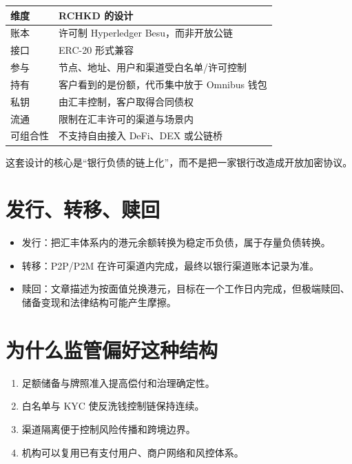 {\def\LTcaptype{none} %
\begin{longtable}[]{@{}ll@{}}
\toprule\noalign{}
维度 & RCHKD 的设计 \\
\midrule\noalign{}
\endhead
\bottomrule\noalign{}
\endlastfoot
账本 & 许可制 Hyperledger Besu，而非开放公链 \\
接口 & ERC-20 形式兼容 \\
参与 & 节点、地址、用户和渠道受白名单/许可控制 \\
持有 & 客户看到的是份额，代币集中放于 Omnibus 钱包 \\
私钥 & 由汇丰控制，客户取得合同债权 \\
流通 & 限制在汇丰许可的渠道与场景内 \\
可组合性 & 不支持自由接入 DeFi、DEX 或公链桥 \\
\end{longtable}
}

这套设计的核心是``银行负债的链上化''，而不是把一家银行改造成开放加密协议。

\section{发行、转移、赎回}\label{ux53d1ux884cux8f6cux79fbux8d4eux56de}

\begin{itemize}
\tightlist
\item
  发行：把汇丰体系内的港元余额转换为稳定币负债，属于存量负债转换。
\item
  转移：P2P/P2M 在许可渠道内完成，最终以银行渠道账本记录为准。
\item
  赎回：文章描述为按面值兑换港元，目标在一个工作日内完成，但极端赎回、储备变现和法律结构可能产生摩擦。
\end{itemize}

\section{为什么监管偏好这种结构}\label{ux4e3aux4ec0ux4e48ux76d1ux7ba1ux504fux597dux8fd9ux79cdux7ed3ux6784}

\begin{enumerate}
\def\labelenumi{\arabic{enumi}.}
\tightlist
\item
  足额储备与牌照准入提高偿付和治理确定性。
\item
  白名单与 KYC 使反洗钱控制链保持连续。
\item
  渠道隔离便于控制风险传播和跨境边界。
\item
  机构可以复用已有支付用户、商户网络和风控体系。
\end{enumerate}

